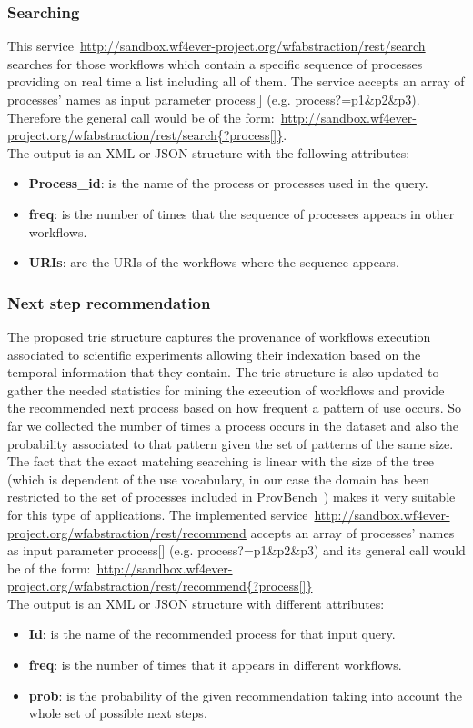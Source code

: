 \subsubsection{Searching}

This service~\url{http://sandbox.wf4ever-project.org/wfabstraction/rest/search} searches for those workflows which contain a specific sequence of processes providing on real time a list including all of them. The service accepts an array of processes' names as input parameter process[] (e.g. process?=p1\&p2\&p3). Therefore the general call would be of the form:~\url{http://sandbox.wf4ever-project.org/wfabstraction/rest/search{?process[]}}.\\

The output is an XML or JSON structure with the following attributes: 
\begin{itemize}
\item \textbf{Process\_id}: is the name of the process or processes used in the query.
\item \textbf{freq}: is the number of times that the sequence of processes appears in other workflows.
\item \textbf{URIs}: are the URIs of the workflows where the sequence appears. 
\end{itemize}

\subsubsection{Next step recommendation}
The proposed trie structure captures the provenance of workflows execution associated to scientific experiments allowing
their indexation based on the temporal information that they contain. The trie structure is also updated to gather
the needed statistics for mining the execution of workflows and provide the recommended next process based on how frequent 
a pattern of use occurs. So far we collected the number of times a process occurs in the dataset and also the probability associated 
to that pattern given the set of patterns of the same size. The fact that the exact matching searching is linear with the size of the tree (which is dependent of the use vocabulary, in our case the domain has been restricted to the set of processes included in ProvBench~\cite{khalid_13}) makes it very suitable for 
this type of applications. The implemented service~\url{http://sandbox.wf4ever-project.org/wfabstraction/rest/recommend} accepts an array of processes' names as input parameter process[] (e.g. process?=p1\&p2\&p3) and its general call would be of the form:~\url{http://sandbox.wf4ever-project.org/wfabstraction/rest/recommend{?process[]}} \\

The output is an XML or JSON structure with different attributes:
\begin{itemize}
\item \textbf{Id}: is the name of the recommended process for that input query.
\item \textbf{freq}:  is the number of times that it appears in different workflows.
\item \textbf{prob}:  is the probability of the given recommendation taking into account the whole set of possible next steps.
\end{itemize}